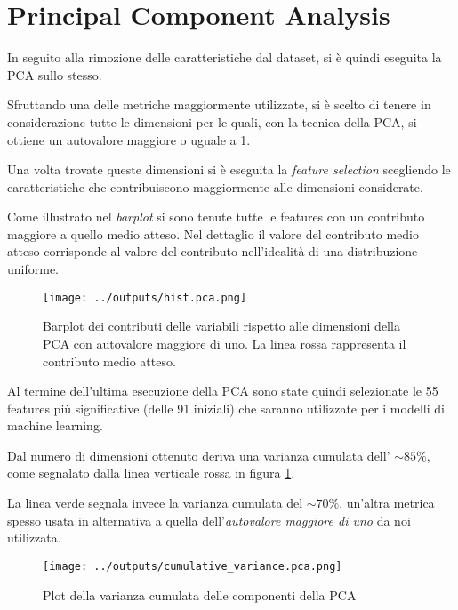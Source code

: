 \section{Principal Component Analysis}
In seguito alla rimozione delle caratteristiche dal dataset, si è quindi eseguita 
la PCA sullo stesso. 

Sfruttando una delle metriche maggiormente utilizzate, si è scelto di tenere 
in considerazione tutte le dimensioni per le quali, con la tecnica della PCA, 
si ottiene un autovalore maggiore o uguale a 1.

Una volta trovate queste dimensioni si è eseguita la \textit{feature selection} 
scegliendo le caratteristiche che contribuiscono maggiormente alle dimensioni considerate.

Come illustrato nel \textit{barplot} si sono tenute tutte le features con un contributo 
maggiore a quello medio atteso. Nel dettaglio il valore del contributo medio atteso corrisponde 
al valore del contributo nell'idealità di una distribuzione uniforme.

\begin{figure}[H]
    \centering
    \texttt{[image: ../outputs/hist.pca.png]}
    \caption{Barplot dei contributi delle variabili rispetto alle dimensioni 
    della PCA con autovalore maggiore di uno. 
    La linea rossa rappresenta il contributo medio atteso.}
\end{figure}

Al termine dell'ultima esecuzione della PCA sono state quindi selezionate le 55 
features più significative (delle 91 iniziali) che saranno utilizzate per i modelli 
di machine learning.

Dal numero di dimensioni ottenuto deriva una varianza cumulata dell'
$\sim 85\%$, come segnalato dalla linea verticale rossa in figura \ref{fig:var}.

La linea verde segnala invece la varianza cumulata del $\sim 70\%$, un'altra
metrica spesso usata in alternativa a quella dell'\textit{autovalore maggiore di uno} 
da noi utilizzata.

\begin{figure}[H]
    \centering
    \texttt{[image: ../outputs/cumulative\_variance.pca.png]}
    \caption{Plot della varianza cumulata delle componenti della PCA}
    \label{fig:var}
\end{figure}